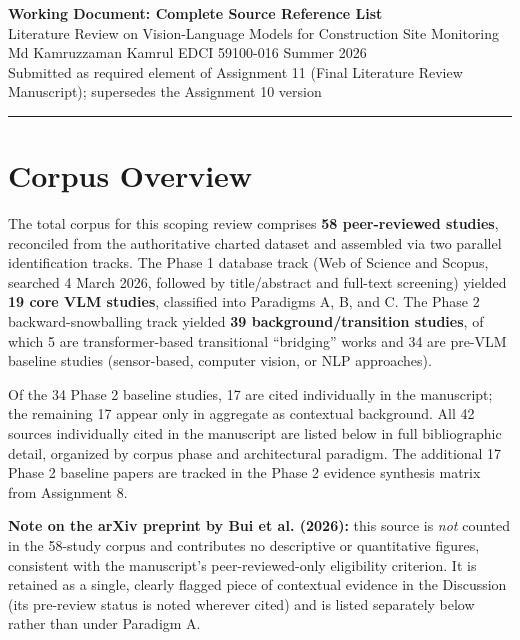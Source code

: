 \documentclass[11pt]{article}
\begin{document}
\begin{center}
{\Large\bfseries\color{headingblue} Working Document: Complete Source Reference List}\\[0.4em]
{\normalsize Literature Review on Vision-Language Models for Construction Site Monitoring}\\[0.25em]
{\normalsize Md Kamruzzaman Kamrul \quad\textbar\quad EDCI 59100-016 \quad\textbar\quad Summer 2026}\\[0.2em]
{\small Submitted as required element of Assignment 11 (Final Literature Review Manuscript); supersedes the Assignment 10 version}
\end{center}

\vspace{0.5em}
\noindent\rule{\linewidth}{0.4pt}
\vspace{0.2em}

\section*{Corpus Overview}

The total corpus for this scoping review comprises \textbf{58 peer-reviewed studies}, reconciled from the authoritative charted dataset and assembled via two parallel identification tracks. The Phase 1 database track (Web of Science and Scopus, searched 4 March 2026, followed by title/abstract and full-text screening) yielded \textbf{19 core VLM studies}, classified into Paradigms A, B, and C. The Phase 2 backward-snowballing track yielded \textbf{39 background/transition studies}, of which 5 are transformer-based transitional ``bridging'' works and 34 are pre-VLM baseline studies (sensor-based, computer vision, or NLP approaches).

Of the 34 Phase 2 baseline studies, 17 are cited individually in the manuscript; the remaining 17 appear only in aggregate as contextual background. All 42 sources individually cited in the manuscript are listed below in full bibliographic detail, organized by corpus phase and architectural paradigm. The additional 17 Phase 2 baseline papers are tracked in the Phase 2 evidence synthesis matrix from Assignment 8.

\textbf{Note on the arXiv preprint by Bui et al. (2026):} this source is \emph{not} counted in the 58-study corpus and contributes no descriptive or quantitative figures, consistent with the manuscript's peer-reviewed-only eligibility criterion. It is retained as a single, clearly flagged piece of contextual evidence in the Discussion (its pre-review status is noted wherever cited) and is listed separately below rather than under Paradigm A.
\end{document}
